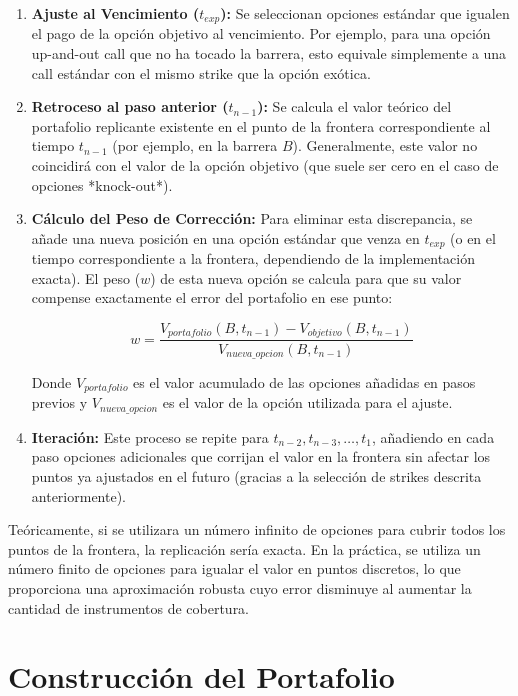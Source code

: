 \begin{enumerate} 
  \item \textbf{Ajuste al Vencimiento ($t_{exp}$):} Se seleccionan opciones estándar que igualen el pago de la opción objetivo al vencimiento. Por ejemplo, para una opción up-and-out call que no ha tocado la barrera, esto equivale simplemente a una call estándar con el mismo strike que la opción exótica.
  
  \item \textbf{Retroceso al paso anterior ($t_{n-1}$):} Se calcula el valor teórico del portafolio replicante existente en el punto de la frontera correspondiente al tiempo $t_{n-1}$ (por ejemplo, en la barrera $B$). Generalmente, este valor no coincidirá con el valor de la opción objetivo (que suele ser cero en el caso de opciones *knock-out*).
  
  \item \textbf{Cálculo del Peso de Corrección:} Para eliminar esta discrepancia, se añade una nueva posición en una opción estándar que venza en $t_{exp}$ (o en el tiempo correspondiente a la frontera, dependiendo de la implementación exacta). El peso ($w$) de esta nueva opción se calcula para que su valor compense exactamente el error del portafolio en ese punto:

  \begin{equation}
  w = \frac{V_{portafolio}(B, t_{n-1}) - V_{objetivo}(B, t_{n-1})}{V_{nueva\_opcion}(B, t_{n-1})}
  \end{equation}

  Donde $V_{portafolio}$ es el valor acumulado de las opciones añadidas en pasos previos y $V_{nueva\_opcion}$ es el valor de la opción utilizada para el ajuste.

  \item \textbf{Iteración:} Este proceso se repite para $t_{n-2}, t_{n-3}, \dots, t_1$, añadiendo en cada paso opciones adicionales que corrijan el valor en la frontera sin afectar los puntos ya ajustados en el futuro (gracias a la selección de strikes descrita anteriormente).
\end{enumerate}

Teóricamente, si se utilizara un número infinito de opciones para cubrir todos los puntos de la frontera, la replicación sería exacta. En la práctica, se utiliza un número finito de opciones para igualar el valor en puntos discretos, lo que proporciona una aproximación robusta cuyo error disminuye al aumentar la cantidad de instrumentos de cobertura.

\section{Construcción del Portafolio}


